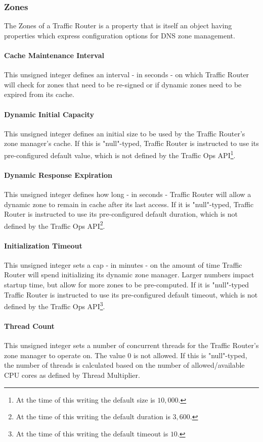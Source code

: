 \subsubsection{Zones}
The Zones of a Traffic Router is a property that is itself an object having
properties which express configuration options for DNS zone management.

\paragraph{Cache Maintenance Interval}
This unsigned integer defines an interval - in seconds - on which Traffic Router
will check for zones that need to be re-signed or if dynamic zones need to be
expired from its cache.

\paragraph{Dynamic Initial Capacity}
This unsigned integer defines an initial size to be used by the Traffic Router's
zone manager's cache. If this is "null"-typed, Traffic Router is instructed to
use its pre-configured default value, which is not defined by the Traffic Ops
API\footnote{At the time of this writing the default size is $10,000$.}.

\paragraph{Dynamic Response Expiration}
This unsigned integer defines how long - in seconds - Traffic Router will allow
a dynamic zone to remain in cache after its last access. If it is "null"-typed,
Traffic Router is instructed to use its pre-configured default duration, which
is not defined by the Traffic Ops API\footnote{At the time of this writing the
default duration is $3,600$.}.

\paragraph{Initialization Timeout}
This unsigned integer sets a cap - in minutes - on the amount of time Traffic
Router will spend initializing its dynamic zone manager. Larger numbers impact
startup time, but allow for more zones to be pre-computed. If it is "null"-typed
Traffic Router is instructed to use its pre-configured default timeout, which is
not defined by the Traffic Ops API\footnote{At the time of this writing the
default timeout is $10$.}.

\paragraph{Thread Count}
This unsigned integer sets a number of concurrent threads for the Traffic
Router's zone manager to operate on. The value 0 is not allowed. If this is
"null"-typed, the number of threads is calculated based on the number of
allowed/available CPU cores as defined by Thread Multiplier.

